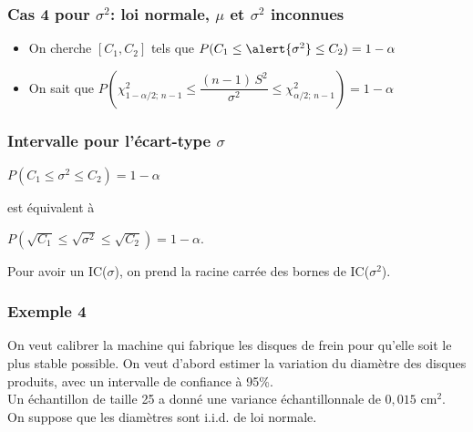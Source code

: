 \documentclass{BeamerTemplate}
\begin{document}
\begin{frame}[t]
 \frametitle{Cas 4 pour $\sigma^2$: loi normale, $\mu$ et $\sigma^2$ inconnues}

 \begin{itemize} \itemsep3mm
\item On cherche $[C_1, C_2]$ tels que $P(C_1\le \alert{\sigma^2} \le C_2)=1-\alpha$
\item On sait que $P\left(\chi^2_{1-\alpha/2;\,n-1}\le \dfrac{(n-1)\,S^2}{\sigma^2}\le \chi^2_{\alpha/2;\,n-1}\right)=1-\alpha$
\end{itemize}


\end{frame}

\begin{frame}[t]
 \frametitle{Intervalle pour l'écart-type $\sigma$}

  $P\left(C_1\le \sigma^2\le C_2\right)=1- \alpha $
  \bigskip

  est équivalent à
    \bigskip

  $P\left(\sqrt{C_1}\le \sqrt{\sigma^2}\le\sqrt{C_2}\right)=1 - \alpha $.
    \bigskip

  Pour avoir un IC($\sigma$), on prend la racine carrée des bornes de IC($\sigma^2$).

\end{frame}

\begin{frame}[t]
 \frametitle{Exemple 4}

 {\small
 On veut calibrer la machine qui fabrique les disques de frein pour qu'elle soit le plus stable possible. On veut d'abord estimer la variation du diamètre des disques produits, avec un intervalle de confiance  à 95\%.\\

 Un échantillon de taille 25  a donné une variance échantillonnale de $0,015$ cm$^2$.  On suppose que les diamètres sont i.i.d. de loi normale.}

\end{frame}
\end{document}
